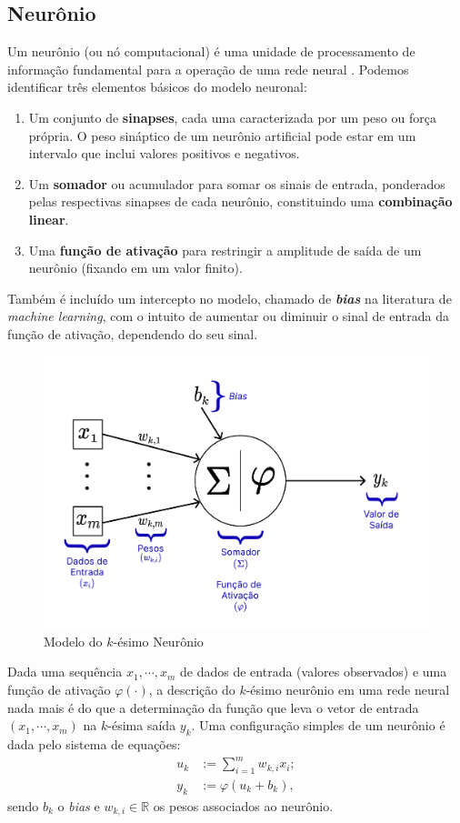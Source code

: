 \documentclass[twoside]{automatextcc}
\newcommand{\R}{\mathds{R}}
\begin{document}
\subsection{Neurônio}
Um neurônio (ou nó computacional) é uma unidade de processamento de informação fundamental para a operação de uma rede neural \citep{haykin2009}. Podemos identificar três elementos básicos do modelo neuronal:
\begin{enumerate}
    \item Um conjunto de \textbf{sinapses}, cada uma caracterizada por um peso ou força própria. O peso sináptico de um neurônio artificial pode estar em um intervalo que inclui valores positivos e negativos.
    \item Um \textbf{somador} ou acumulador para somar os sinais de entrada, ponderados pelas respectivas sinapses de cada neurônio, constituindo uma \textbf{combinação linear}.
    \item Uma \textbf{função de ativação} para restringir a amplitude de saída de um neurônio (fixando em um valor finito).
\end{enumerate}
Também é incluído um intercepto no modelo, chamado de \textbf{\textit{bias}} na literatura de \textit{machine learning}, com o intuito de aumentar ou diminuir o sinal de entrada da função de ativação, dependendo do seu sinal.

\FloatBarrier
\begin{figure}[h!]
    \centering
    \includegraphics[width=.7\textwidth]{figuras/neuron_model.pdf}
	\caption{Modelo do $k$-ésimo Neurônio \citep[adaptado de][]{hair2005,haykin2009}}
\end{figure}

Dada uma sequência $x_1,\cdots,x_m$ de dados de entrada (valores observados) e uma função de ativação $\varphi(\cdot)$, a descrição do $k$-ésimo neurônio em uma rede neural nada mais é do que a determinação da função que leva o vetor de entrada $(x_1,\cdots,x_m)$ na $k$-ésima saída $y_k$. Uma configuração simples de um neurônio é dada pelo sistema de equações:
\begin{align}\label{vk}
    u_k & := \sum_{i=1}^{m} w_{k,i}x_i; \nonumber\\   
    y_k & := \varphi(u_k + b_k),
\end{align}
sendo $b_k$ o \textit{bias} e $w_{k,i} \in \R$ os pesos associados ao neurônio.
\end{document}
